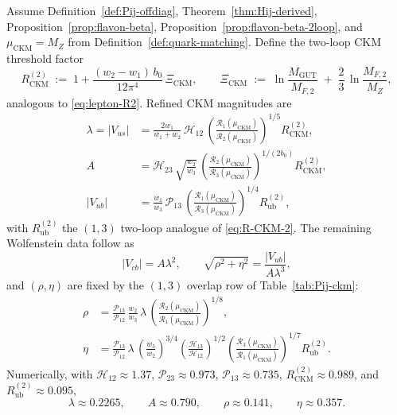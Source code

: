 \begin{proposition}
\label{prop:ckm-precision}
Assume Definition~\ref{def:Pij-offdiag}, Theorem~\ref{thm:Hij-derived},
Proposition~\ref{prop:flavon-beta}, Proposition~\ref{prop:flavon-beta-2loop},
and $\mu_{\mathrm{CKM}}=M_Z$ from Definition~\ref{def:quark-matching}.
Define the two-loop CKM threshold factor
\begin{equation}\label{eq:R-CKM-2}
  R_{\mathrm{CKM}}^{(2)}
  \;:=\;
  1 + \frac{(w_2-w_1)\,b_0}{12\pi^4}\,\Xi_{\mathrm{CKM}},
  \qquad
  \Xi_{\mathrm{CKM}}
  \;:=\;
  \ln\!\frac{M_{\mathrm{GUT}}}{M_{F,2}}
  \;+\;
  \frac{2}{3}\,\ln\!\frac{M_{F,2}}{M_Z},
\end{equation}
analogous to \eqref{eq:lepton-R2}. Refined CKM magnitudes are
\begin{align}
  \lambda = |V_{us}|
  &=
  \frac{2w_1}{w_1+w_2}\,\mathcal{H}_{12}\,
  \left(
    \frac{\mathcal{R}_1(\mu_{\mathrm{CKM}})}
         {\mathcal{R}_2(\mu_{\mathrm{CKM}})}
  \right)^{\!1/5}
  R_{\mathrm{CKM}}^{(2)},
  \label{eq:lambda-refined}\\
  A
  &=
  \mathcal{H}_{23}\,
  \sqrt{\frac{w_2}{w_3}}\,
  \left(
    \frac{\mathcal{R}_2(\mu_{\mathrm{CKM}})}
         {\mathcal{R}_3(\mu_{\mathrm{CKM}})}
  \right)^{\!1/(2b_0)}
  R_{\mathrm{CKM}}^{(2)},
  \label{eq:A-refined}\\
  |V_{ub}|
  &=
  \frac{w_1}{w_3}\,\mathcal{P}_{13}\,
  \left(
    \frac{\mathcal{R}_1(\mu_{\mathrm{CKM}})}
         {\mathcal{R}_3(\mu_{\mathrm{CKM}})}
  \right)^{\!1/4}
  R_{\mathrm{ub}}^{(2)},
  \label{eq:Vub-refined}
\end{align}
with $R_{\mathrm{ub}}^{(2)}$ the $(1,3)$ two-loop analogue of
\eqref{eq:R-CKM-2}. The remaining Wolfenstein data follow as
\begin{equation}\label{eq:wolfenstein-from-V}
  |V_{cb}| = A\lambda^2,
  \qquad
  \sqrt{\rho^2+\eta^2} = \frac{|V_{ub}|}{A\lambda^3},
\end{equation}
and $(\rho,\eta)$ are fixed by the $(1,3)$ overlap row of
Table~\ref{tab:Pij-ckm}:
\begin{align}
  \rho
  &=
  \frac{\mathcal{P}_{13}}{\mathcal{P}_{12}}\,
  \frac{w_2}{w_3}\,\lambda\,
  \left(
    \frac{\mathcal{R}_2(\mu_{\mathrm{CKM}})}
         {\mathcal{R}_1(\mu_{\mathrm{CKM}})}
  \right)^{\!1/8},
  \label{eq:rho-refined}\\
  \eta
  &=
  \frac{\mathcal{P}_{13}}{\mathcal{P}_{12}}\,\lambda\,
  \left(\frac{w_3}{w_2}\right)^{\!3/4}
  \left(\frac{\mathcal{H}_{13}}{\mathcal{H}_{12}}\right)^{\!1/2}
  \left(
    \frac{\mathcal{R}_3(\mu_{\mathrm{CKM}})}
         {\mathcal{R}_1(\mu_{\mathrm{CKM}})}
  \right)^{\!1/7}
  R_{\mathrm{ub}}^{(2)}.
  \label{eq:eta-refined}
\end{align}
Numerically, with $\mathcal{H}_{12}\approx1.37$,
$\mathcal{P}_{23}\approx0.973$, $\mathcal{P}_{13}\approx0.735$,
$R_{\mathrm{CKM}}^{(2)}\approx0.989$, and $R_{\mathrm{ub}}^{(2)}\approx0.095$,
\begin{equation}\label{eq:ckm-wolfenstein-values}
  \lambda\approx0.2265,
  \qquad
  A\approx0.790,
  \qquad
  \rho\approx0.141,
  \qquad
  \eta\approx0.357.
\end{equation}
\end{proposition}


